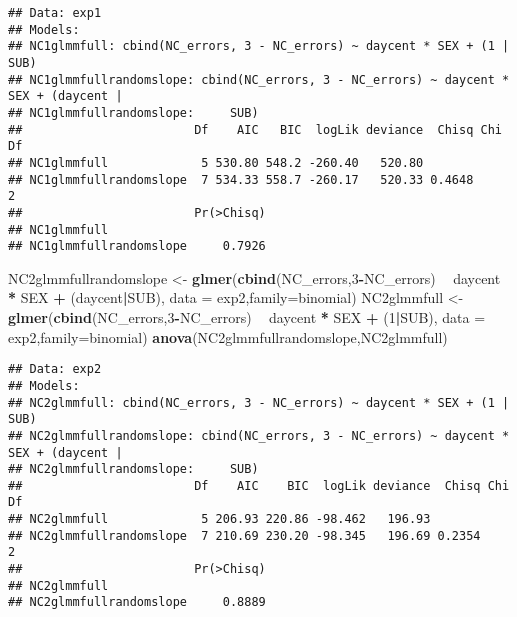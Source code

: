 \documentclass[]{article}
\newenvironment{Shaded}{\begin{snugshade}}{\end{snugshade}}
\newcommand{\KeywordTok}[1]{\textcolor[rgb]{0.13,0.29,0.53}{\textbf{#1}}}
\newcommand{\DataTypeTok}[1]{\textcolor[rgb]{0.13,0.29,0.53}{#1}}
\newcommand{\DecValTok}[1]{\textcolor[rgb]{0.00,0.00,0.81}{#1}}
\newcommand{\StringTok}[1]{\textcolor[rgb]{0.31,0.60,0.02}{#1}}
\newcommand{\OperatorTok}[1]{\textcolor[rgb]{0.81,0.36,0.00}{\textbf{#1}}}
\newcommand{\NormalTok}[1]{#1}
\begin{document}
\begin{verbatim}
## Data: exp1
## Models:
## NC1glmmfull: cbind(NC_errors, 3 - NC_errors) ~ daycent * SEX + (1 | SUB)
## NC1glmmfullrandomslope: cbind(NC_errors, 3 - NC_errors) ~ daycent * SEX + (daycent | 
## NC1glmmfullrandomslope:     SUB)
##                        Df    AIC   BIC  logLik deviance  Chisq Chi Df
## NC1glmmfull             5 530.80 548.2 -260.40   520.80              
## NC1glmmfullrandomslope  7 534.33 558.7 -260.17   520.33 0.4648      2
##                        Pr(>Chisq)
## NC1glmmfull                      
## NC1glmmfullrandomslope     0.7926
\end{verbatim}

\begin{Shaded}
\begin{Highlighting}[]
\NormalTok{NC2glmmfullrandomslope <-}\StringTok{ }\KeywordTok{glmer}\NormalTok{(}\KeywordTok{cbind}\NormalTok{(NC_errors,}\DecValTok{3}\OperatorTok{-}\NormalTok{NC_errors) }\OperatorTok{~}\StringTok{ }\NormalTok{daycent }\OperatorTok{*}\StringTok{ }\NormalTok{SEX }\OperatorTok{+}\StringTok{ }\NormalTok{(daycent}\OperatorTok{|}\NormalTok{SUB), }\DataTypeTok{data =}\NormalTok{ exp2,}\DataTypeTok{family=}\NormalTok{binomial)}
\NormalTok{NC2glmmfull <-}\StringTok{ }\KeywordTok{glmer}\NormalTok{(}\KeywordTok{cbind}\NormalTok{(NC_errors,}\DecValTok{3}\OperatorTok{-}\NormalTok{NC_errors) }\OperatorTok{~}\StringTok{ }\NormalTok{daycent }\OperatorTok{*}\StringTok{ }\NormalTok{SEX }\OperatorTok{+}\StringTok{ }\NormalTok{(}\DecValTok{1}\OperatorTok{|}\NormalTok{SUB), }\DataTypeTok{data =}\NormalTok{ exp2,}\DataTypeTok{family=}\NormalTok{binomial)}
\KeywordTok{anova}\NormalTok{(NC2glmmfullrandomslope,NC2glmmfull)}
\end{Highlighting}
\end{Shaded}

\begin{verbatim}
## Data: exp2
## Models:
## NC2glmmfull: cbind(NC_errors, 3 - NC_errors) ~ daycent * SEX + (1 | SUB)
## NC2glmmfullrandomslope: cbind(NC_errors, 3 - NC_errors) ~ daycent * SEX + (daycent | 
## NC2glmmfullrandomslope:     SUB)
##                        Df    AIC    BIC  logLik deviance  Chisq Chi Df
## NC2glmmfull             5 206.93 220.86 -98.462   196.93              
## NC2glmmfullrandomslope  7 210.69 230.20 -98.345   196.69 0.2354      2
##                        Pr(>Chisq)
## NC2glmmfull                      
## NC2glmmfullrandomslope     0.8889
\end{verbatim}
\end{document}
